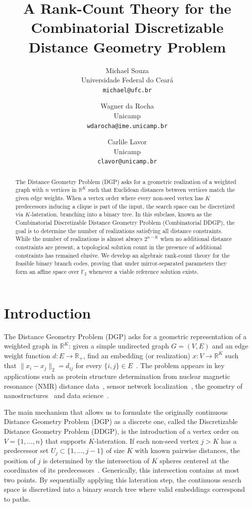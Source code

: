 \documentclass[11pt]{article}
\title{A Rank-Count Theory for the Combinatorial Discretizable Distance Geometry Problem}
\author{
Michael Souza\\
Universidade Federal do Cear\'a\\
\texttt{michael@ufc.br}
\and
Wagner da Rocha\\
Unicamp\\
\texttt{wdarocha@ime.unicamp.br}
\and
Carlile Lavor\\
Unicamp\\
\texttt{clavor@unicamp.br}
}
\date{}
\theoremstyle{plain}
\theoremstyle{definition}
\begin{document}
\maketitle

\begin{abstract}
The Distance Geometry Problem (DGP) asks for a geometric realization of a weighted graph with \(n\) vertices in \(\mathbb{R}^K\) such that Euclidean distances between vertices match the given edge weights. When a vertex order where every non-seed vertex has \(K\) predecessors inducing a clique is part of the input, the search space can be discretized via \(K\)-lateration, branching into a binary tree. In this subclass, known as the Combinatorial Discretizable Distance Geometry Problem (Combinatorial DDGP), the goal is to determine the number of realizations satisfying all distance constraints. While the number of realizations is almost always \(2^{n-K}\) when no additional distance constraints are present, a topological solution count in the presence of additional constraints has remained elusive. We develop an algebraic rank-count theory for the feasible binary branch codes, proving that under mirror-separated parameters they form an affine space over \(\mathbb{F}_2\) whenever a viable reference solution exists.
\end{abstract}

\section{Introduction}
\label{sec:intro}

The Distance Geometry Problem (DGP) asks for a geometric representation of a weighted graph in $\mathbb{R}^K$: given a simple undirected graph $G = (V, E)$ and an edge weight function $d: E \to \mathbb{R}_+$, find an embedding (or realization) $x: V \to \mathbb{R}^K$ such that $\|x_i - x_j\|_2 = d_{ij}$ for every $\{i,j\}\in E$~\cite{mucherino2012discretizable}. The problem appears in key applications such as protein structure determination from nuclear magnetic resonance (NMR) distance data~\cite{liberti2008branch}, sensor network localization~\cite{yemini1978positioning}, the geometry of nanostructures~\cite{mucherino2020analysis} and data science~\cite{liberti2020distance}.

The main mechanism that allows us to formulate the originally continuous Distance Geometry Problem (DGP) as a discrete one, called the Discretizable Distance Geometry Problem (DDGP), is the introduction of a vertex order on $V = \{1, \ldots, n\}$ that supports $K$-lateration. If each non-seed vertex $j > K$ has a predecessor set $U_j \subset \{1, \ldots, j-1\}$ of size $K$ with known pairwise distances, the position of $j$ is determined by the intersection of $K$ spheres centered at the coordinates of its predecessors~\cite{mucherino2012discretizable,liberti2014number}. Generically, this intersection contains at most two points. By sequentially applying this lateration step, the continuous search space is discretized into a binary search tree where valid embeddings correspond to paths. 
\end{document}
